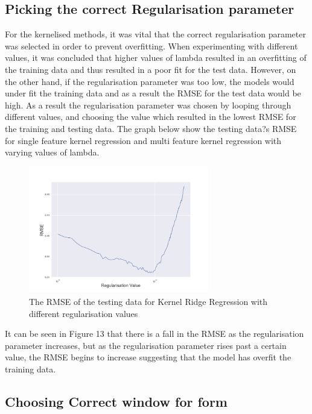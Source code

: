 \documentclass[a4paper,11pt,twoside]{article}
\begin{document}
\subsection{Picking the correct Regularisation parameter}

For the kernelised methods, it was vital that the correct regularisation parameter was selected in order to prevent overfitting. When experimenting with different values, it was concluded that higher values of lambda resulted in an overfitting of the training data and thus resulted in a poor fit for the test data. However, on the other hand, if the regularisation parameter was too low, the models would under fit the training data and as a result the RMSE for the test data would be high. As a result the regularisation parameter was chosen by looping through different values, and choosing the value which resulted in the lowest RMSE for the training and testing data. The graph below show the testing data?s RMSE for single feature kernel regression and multi feature kernel regression with varying values of lambda. 

      \begin{figure}[!htb]
        \centerline{\includegraphics[width=0.7\textwidth]
        {../errvals.png}}
        \caption{\label{fig:my-label} The RMSE of the testing data for Kernel Ridge Regression with different regularisation values}
      \end{figure}


It can be seen in Figure 13 that there is a fall in the RMSE as the regularisation parameter increases, but as the regularisation parameter rises past a certain value, the RMSE begins to increase suggesting that the model has overfit the training data.



\subsection{Choosing Correct window for form}
\end{document}
